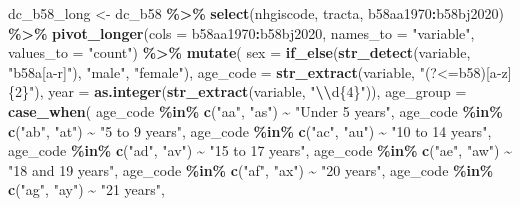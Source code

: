 \documentclass[
]{article}
\newenvironment{Shaded}{\begin{snugshade}}{\end{snugshade}}
\newcommand{\AttributeTok}[1]{\textcolor[rgb]{0.13,0.29,0.53}{#1}}
\newcommand{\FunctionTok}[1]{\textcolor[rgb]{0.13,0.29,0.53}{\textbf{#1}}}
\newcommand{\NormalTok}[1]{#1}
\newcommand{\OtherTok}[1]{\textcolor[rgb]{0.56,0.35,0.01}{#1}}
\newcommand{\SpecialCharTok}[1]{\textcolor[rgb]{0.81,0.36,0.00}{\textbf{#1}}}
\newcommand{\StringTok}[1]{\textcolor[rgb]{0.31,0.60,0.02}{#1}}
\begin{document}
\begin{Shaded}
\begin{Highlighting}[]
\NormalTok{dc\_b58\_long }\OtherTok{\textless{}{-}}\NormalTok{ dc\_b58 }\SpecialCharTok{\%\textgreater{}\%}
  \FunctionTok{select}\NormalTok{(nhgiscode, tracta, b58aa1970}\SpecialCharTok{:}\NormalTok{b58bj2020) }\SpecialCharTok{\%\textgreater{}\%}
  \FunctionTok{pivot\_longer}\NormalTok{(}\AttributeTok{cols =}\NormalTok{ b58aa1970}\SpecialCharTok{:}\NormalTok{b58bj2020, }\AttributeTok{names\_to =} \StringTok{"variable"}\NormalTok{, }\AttributeTok{values\_to =} \StringTok{"count"}\NormalTok{) }\SpecialCharTok{\%\textgreater{}\%}
  \FunctionTok{mutate}\NormalTok{(}
    \AttributeTok{sex =} \FunctionTok{if\_else}\NormalTok{(}\FunctionTok{str\_detect}\NormalTok{(variable, }\StringTok{"b58a[a{-}r]"}\NormalTok{), }\StringTok{"male"}\NormalTok{, }\StringTok{"female"}\NormalTok{),}
    \AttributeTok{age\_code =} \FunctionTok{str\_extract}\NormalTok{(variable, }\StringTok{"(?\textless{}=b58)[a{-}z]\{2\}"}\NormalTok{),}
    \AttributeTok{year =} \FunctionTok{as.integer}\NormalTok{(}\FunctionTok{str\_extract}\NormalTok{(variable, }\StringTok{"}\SpecialCharTok{\textbackslash{}\textbackslash{}}\StringTok{d\{4\}"}\NormalTok{)),}
    \AttributeTok{age\_group =} \FunctionTok{case\_when}\NormalTok{(}
\NormalTok{      age\_code }\SpecialCharTok{\%in\%} \FunctionTok{c}\NormalTok{(}\StringTok{"aa"}\NormalTok{, }\StringTok{"as"}\NormalTok{) }\SpecialCharTok{\textasciitilde{}} \StringTok{"Under 5 years"}\NormalTok{,}
\NormalTok{      age\_code }\SpecialCharTok{\%in\%} \FunctionTok{c}\NormalTok{(}\StringTok{"ab"}\NormalTok{, }\StringTok{"at"}\NormalTok{) }\SpecialCharTok{\textasciitilde{}} \StringTok{"5 to 9 years"}\NormalTok{,}
\NormalTok{      age\_code }\SpecialCharTok{\%in\%} \FunctionTok{c}\NormalTok{(}\StringTok{"ac"}\NormalTok{, }\StringTok{"au"}\NormalTok{) }\SpecialCharTok{\textasciitilde{}} \StringTok{"10 to 14 years"}\NormalTok{,}
\NormalTok{      age\_code }\SpecialCharTok{\%in\%} \FunctionTok{c}\NormalTok{(}\StringTok{"ad"}\NormalTok{, }\StringTok{"av"}\NormalTok{) }\SpecialCharTok{\textasciitilde{}} \StringTok{"15 to 17 years"}\NormalTok{,}
\NormalTok{      age\_code }\SpecialCharTok{\%in\%} \FunctionTok{c}\NormalTok{(}\StringTok{"ae"}\NormalTok{, }\StringTok{"aw"}\NormalTok{) }\SpecialCharTok{\textasciitilde{}} \StringTok{"18 and 19 years"}\NormalTok{,}
\NormalTok{      age\_code }\SpecialCharTok{\%in\%} \FunctionTok{c}\NormalTok{(}\StringTok{"af"}\NormalTok{, }\StringTok{"ax"}\NormalTok{) }\SpecialCharTok{\textasciitilde{}} \StringTok{"20 years"}\NormalTok{,}
\NormalTok{      age\_code }\SpecialCharTok{\%in\%} \FunctionTok{c}\NormalTok{(}\StringTok{"ag"}\NormalTok{, }\StringTok{"ay"}\NormalTok{) }\SpecialCharTok{\textasciitilde{}} \StringTok{"21 years"}\NormalTok{,}

\end{Highlighting}
\end{Shaded}
\end{document}
